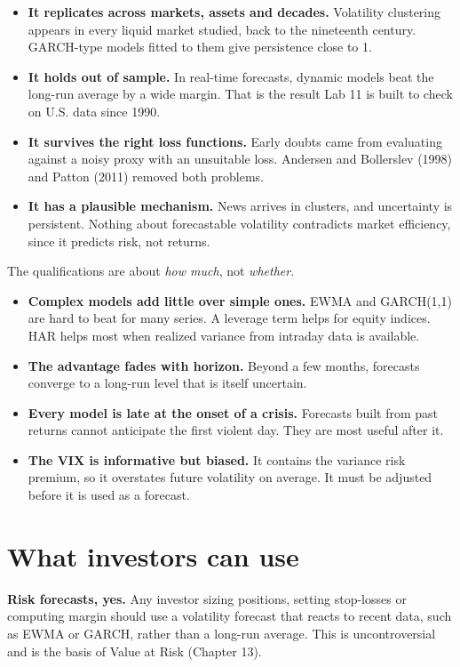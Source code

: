 \begin{itemize}
  \item \textbf{It replicates across markets, assets and decades.} Volatility clustering appears in every liquid market studied, back to the nineteenth century. GARCH-type models fitted to them give persistence close to 1.
  \item \textbf{It holds out of sample.} In real-time forecasts, dynamic models beat the long-run average by a wide margin. That is the result Lab 11 is built to check on U.S. data since 1990.
  \item \textbf{It survives the right loss functions.} Early doubts came from evaluating against a noisy proxy with an unsuitable loss. Andersen and Bollerslev (1998) and Patton (2011) removed both problems.
  \item \textbf{It has a plausible mechanism.} News arrives in clusters, and uncertainty is persistent. Nothing about forecastable volatility contradicts market efficiency, since it predicts risk, not returns.
\end{itemize}

The qualifications are about \emph{how much}, not \emph{whether}.

\begin{itemize}
  \item \textbf{Complex models add little over simple ones.} EWMA and GARCH(1,1) are hard to beat for many series. A leverage term helps for equity indices. HAR helps most when realized variance from intraday data is available.
  \item \textbf{The advantage fades with horizon.} Beyond a few months, forecasts converge to a long-run level that is itself uncertain.
  \item \textbf{Every model is late at the onset of a crisis.} Forecasts built from past returns cannot anticipate the first violent day. They are most useful after it.
  \item \textbf{The VIX is informative but biased.} It contains the variance risk premium, so it overstates future volatility on average. It must be adjusted before it is used as a forecast.
\end{itemize}

\section{What investors can use}
\label{sec:11-investors}

\textbf{Risk forecasts, yes.} Any investor sizing positions, setting stop-losses or computing margin should use a volatility forecast that reacts to recent data, such as EWMA or GARCH, rather than a long-run average. This is uncontroversial and is the basis of Value at Risk (Chapter 13).

